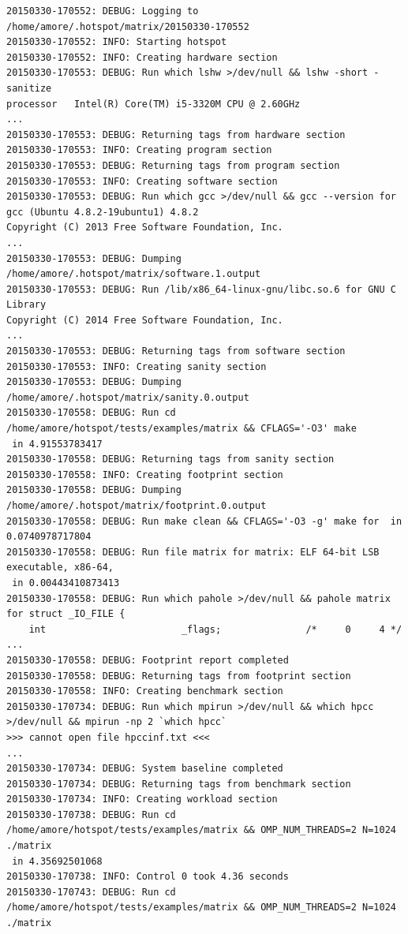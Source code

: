 \documentclass[a4paper]{report}
\begin{document}
\begin{lstlisting}[caption={Salida de Ejemplo},basicstyle=\tiny,label={lst:log}]
20150330-170552: DEBUG: Logging to /home/amore/.hotspot/matrix/20150330-170552
20150330-170552: INFO: Starting hotspot
20150330-170552: INFO: Creating hardware section
20150330-170553: DEBUG: Run which lshw >/dev/null && lshw -short -sanitize
processor   Intel(R) Core(TM) i5-3320M CPU @ 2.60GHz
...
20150330-170553: DEBUG: Returning tags from hardware section
20150330-170553: INFO: Creating program section
20150330-170553: DEBUG: Returning tags from program section
20150330-170553: INFO: Creating software section
20150330-170553: DEBUG: Run which gcc >/dev/null && gcc --version for gcc (Ubuntu 4.8.2-19ubuntu1) 4.8.2
Copyright (C) 2013 Free Software Foundation, Inc.
...
20150330-170553: DEBUG: Dumping /home/amore/.hotspot/matrix/software.1.output
20150330-170553: DEBUG: Run /lib/x86_64-linux-gnu/libc.so.6 for GNU C Library
Copyright (C) 2014 Free Software Foundation, Inc.
...
20150330-170553: DEBUG: Returning tags from software section
20150330-170553: INFO: Creating sanity section
20150330-170553: DEBUG: Dumping /home/amore/.hotspot/matrix/sanity.0.output
20150330-170558: DEBUG: Run cd /home/amore/hotspot/tests/examples/matrix && CFLAGS='-O3' make
 in 4.91553783417
20150330-170558: DEBUG: Returning tags from sanity section
20150330-170558: INFO: Creating footprint section
20150330-170558: DEBUG: Dumping /home/amore/.hotspot/matrix/footprint.0.output
20150330-170558: DEBUG: Run make clean && CFLAGS='-O3 -g' make for  in 0.0740978717804
20150330-170558: DEBUG: Run file matrix for matrix: ELF 64-bit LSB  executable, x86-64,
 in 0.00443410873413
20150330-170558: DEBUG: Run which pahole >/dev/null && pahole matrix for struct _IO_FILE {
	int                        _flags;               /*     0     4 */
...
20150330-170558: DEBUG: Footprint report completed
20150330-170558: DEBUG: Returning tags from footprint section
20150330-170558: INFO: Creating benchmark section
20150330-170734: DEBUG: Run which mpirun >/dev/null && which hpcc >/dev/null && mpirun -np 2 `which hpcc`
>>> cannot open file hpccinf.txt <<<
...
20150330-170734: DEBUG: System baseline completed
20150330-170734: DEBUG: Returning tags from benchmark section
20150330-170734: INFO: Creating workload section
20150330-170738: DEBUG: Run cd /home/amore/hotspot/tests/examples/matrix && OMP_NUM_THREADS=2 N=1024 ./matrix
 in 4.35692501068
20150330-170738: INFO: Control 0 took 4.36 seconds
20150330-170743: DEBUG: Run cd /home/amore/hotspot/tests/examples/matrix && OMP_NUM_THREADS=2 N=1024 ./matrix

\end{lstlisting}
\end{document}
